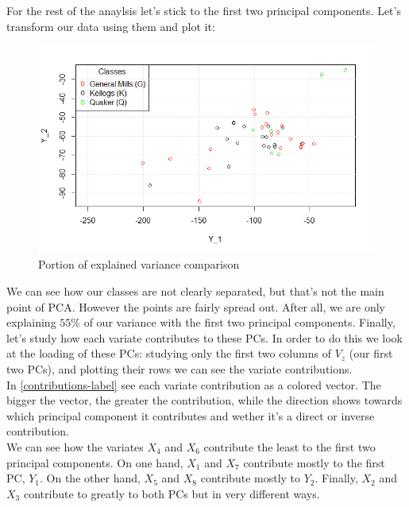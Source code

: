 \documentclass[11pt,a4paper]{article}
\begin{document}
	For the rest of the anaylsis let's stick to the first two principal components. Let's transform our data using them and plot it:
	
	\begin{figure}[H] 
		\centering
		\includegraphics[scale=.9]{./pics/PCA2}
		\caption{Portion of explained variance comparison} \label{Y-dataset-label}
	\end{figure}
	
	We can see how our classes are not clearly separated, but that's not the main point of PCA. However the points are fairly spread out. After all, we are only explaining $55\%$ of our variance with the first two principal components. Finally, let's study how each variate contributes to these PCs. In order to do this we look at the loading of these PCs: studying only the first two columns of $V_z$ (our first two PCs), and plotting their rows we can see the variate contributions. \\
	
	In \ref{contributions-label} see each variate contribution as a colored vector. The bigger the vector, the greater the contribution, while the direction shows towards which principal component it contributes and wether it's a direct or inverse contribution. \\
	
	We can see how the variates $X_4$ and $X_6$ contribute the least to the first two principal components. On one hand, $X_1$ and $X_7$ contribute mostly to the first PC, $Y_1$. On the other hand, $X_5$ and $X_8$ contribute mostly to $Y_2$. Finally, $X_2$ and $X_3$ contribute to greatly to both PCs but in very different ways.
	
\end{document}
